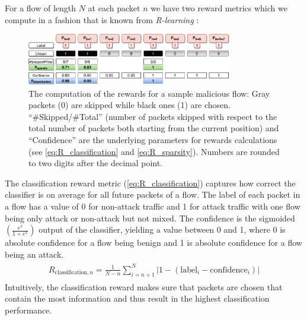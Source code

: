 \documentclass[conference]{IEEEtran}
\begin{document}

For a flow of length $N$ at each packet $n$ we have two reward metrics which we compute in a fashion that is known from \textit{R-learning} \cite{schwartz_reinforcement_1993}:


\begin{figure}
\centering
  \includegraphics[width=0.8\textwidth]{img/rewards_calc_example.pdf}
  \caption{The computation of the rewards for a sample malicious flow: Gray packets (0) are skipped while black ones (1) are chosen. ``\#Skipped\//\#Total'' (number of packets skipped with respect to the total number of packets both starting from the current position) and ``Confidence'' are the underlying parameters for rewards calculations (see \autoref{eq:R_classification} and \autoref{eq:R_sparsity}). Numbers are rounded to two digits after the decimal point.}
  \label{fig:rewards}
\end{figure}

The classification reward metric (\autoref{eq:R_classification}) captures how correct the classifier is on average for all future packets of a flow. The label of each packet in a flow has a value of 0 for non-attack traffic and 1 for attack traffic with one flow being only attack or non-attack but not mixed. The confidence is the sigmoided $\left(\frac{e^x}{1+e^x}\right)$ output of the classifier, yielding a value between 0 and 1, where 0 is absolute confidence for a flow being benign and 1 is absolute confidence for a flow being an attack.
\begin{align}
\begin{split}
R_{\text{classification},n} = \frac{1}{N-n} \sum_{i=n+1}^{N} |1 - \left(\text{label}_i - \text{confidence}_i\right)|
\end{split}
\label{eq:R_classification}
\end{align}
Intuitively, the classification reward makes sure that packets are chosen that contain the most information and thus result in the highest classification performance.
\end{document}
